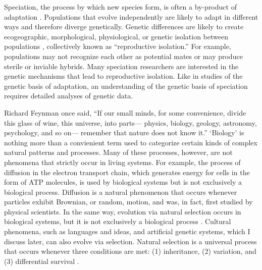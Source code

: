 \begin{doublespace}
Speciation, the process by which new species form,
is often a by-product of adaptation \citep{coy04,sch09,sob10}.
%
Populations that evolve independently are likely to adapt in different ways
and therefore diverge genetically.
%
Genetic differences are likely to create ecogeographic, morphological,
physiological, or genetic isolation between populations \citep{coy04,sch10},
collectively known as ``reproductive isolation.''
%
For example, populations may not recognize each other as potential mates
or may produce sterile or inviable hybrids.
%
Many speciation researchers are interested
in the genetic mechanisms that lead to reproductive isolation.
%
Like in studies of the genetic basis of adaptation,
an understanding of the genetic basis of speciation
requires detailed analyses of genetic data.


%

%

Richard Feynman once said, ``If our small minds, for some convenience,
divide this glass of wine, this universe, into parts---%
physics, biology, geology, astronomy, psychology, and so on---%
remember that nature does not know it.''
%
`Biology' is nothing more than a convienient term used to categorize
certain kinds of complex natural patterns and processes.
%
Many of these processes, however, are not phenomena
that strictly occur in living systems.
%
For example, the process of diffusion in the electron transport chain,
which generates energy for cells in the form of ATP molecules,
is used by biological systems but is not exclusively a biological process.
%
Diffusion is a natural phenomenon that occurs whenever
particles exhibit Brownian, or random, motion,
and was, in fact, first studied by physical scientists.
%
In the same way, evolution via natural selection occurs in biological systems,
but it is not exclusively a biological process \citep{pen07}.
%
Cultural phenomena, such as languages and ideas,
and artificial genetic systems, which I discuss later,
can also evolve via selection.
%
Natural selection is a universal process that occurs whenever
three conditions are met:
(1) inheritance, (2) variation, and (3) differential survival \citep{ada06}.



\end{doublespace}
